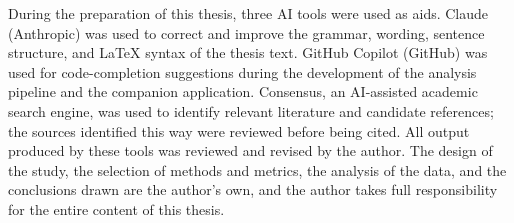 During the preparation of this thesis, three AI tools were used as aids. Claude (Anthropic) was used to correct and improve the grammar, wording, sentence structure, and \LaTeX{} syntax of the thesis text. GitHub Copilot (GitHub) was used for code-completion suggestions during the development of the analysis pipeline and the companion application. Consensus, an AI-assisted academic search engine, was used to identify relevant literature and candidate references; the sources identified this way were reviewed before being cited. All output produced by these tools was reviewed and revised by the author. The design of the study, the selection of methods and metrics, the analysis of the data, and the conclusions drawn are the author's own, and the author takes full responsibility for the entire content of this thesis.
